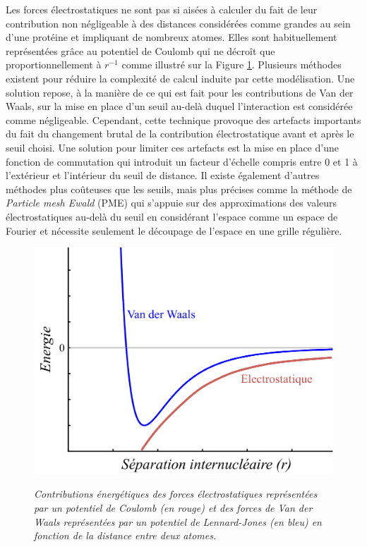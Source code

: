 Les forces électrostatiques ne sont pas si aisées à calculer du fait de leur contribution non négligeable à des distances considérées comme grandes au sein d'une protéine et impliquant de nombreux atomes. Elles sont habituellement représentées grâce au potentiel de Coulomb qui ne décroît que proportionnellement à $r^{-1}$ comme illustré sur la Figure \ref{Fig:coulomb_lennardjones}. Plusieurs méthodes existent pour réduire la complexité de calcul induite par cette modélisation. Une solution repose, à la manière de ce qui est fait pour les contributions de Van der Waals, sur la mise en place d'un seuil au-delà duquel l'interaction est considérée comme négligeable. Cependant, cette technique provoque des artefacts importants du fait du changement brutal de la contribution électrostatique avant et après le seuil choisi. Une solution pour limiter ces artefacts est la mise en place d'une fonction de commutation qui introduit un facteur d'échelle compris entre 0 et 1 à l'extérieur et l'intérieur du seuil de distance. Il existe également d'autres méthodes plus coûteuses que les seuils, mais plus précises comme la méthode de \textit{Particle mesh Ewald} (PME) qui s'appuie sur des approximations des valeurs électrostatiques au-delà du seuil en considérant l'espace comme un espace de Fourier et nécessite seulement le découpage de l'espace en une grille régulière.

\begin{figure}[htb]
  \centering
  {\includegraphics[width=0.65\linewidth]{./figures/ch1/electro_lennardjones.pdf}}
    \caption[Contributions énergétiques des forces électrostatiques et de van der Waals.]{\it Contributions énergétiques des forces électrostatiques représentées par un potentiel de Coulomb (en rouge) et des forces de Van der Waals représentées par un potentiel de Lennard-Jones (en bleu) en fonction de la distance entre deux atomes.
    }
    \label{Fig:coulomb_lennardjones}
  \hspace{0.2cm}
\end{figure}

